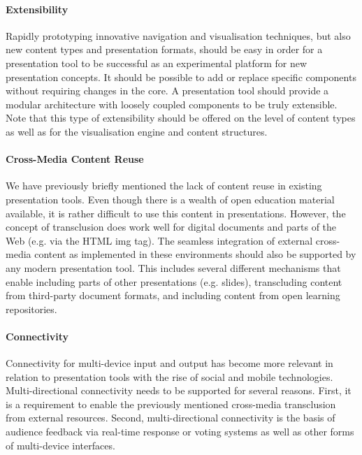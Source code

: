      \paragraph{Extensibility}
     
      Rapidly prototyping innovative navigation and visualisation techniques,
      but also new content types and presentation formats, should be easy in
      order for a presentation tool to be successful as an experimental
      platform for new presentation concepts. It should be possible to add or
      replace specific components without requiring changes in the core. A
      presentation tool should provide a modular architecture with loosely
      coupled components to be truly extensible. Note that this type of
      extensibility should be offered on the level of content types as well as
      for the visualisation engine and content structures.

     \paragraph{Cross-Media Content Reuse}
     
      We have previously briefly mentioned the lack of content reuse in
      existing presentation tools. Even though there is a wealth of open
      education material available, it is rather difficult to use this content
      in presentations. However, the concept of transclusion does work well for
      digital documents and parts of the Web (e.g. via the HTML img tag). The
      seamless integration of external cross-media content as implemented in
      these environments should also be supported by any modern presentation
      tool. This includes several different mechanisms that enable including
      parts of other presentations (e.g. slides), transcluding content from
      third-party document formats, and including content from open learning
      repositories.

     \paragraph{Connectivity}

      Connectivity for multi-device input and output has become more relevant
      in relation to presentation tools with the rise of social and mobile
      technologies. Multi-directional connectivity needs to be supported for
      several reasons. First, it is a requirement to enable the previously
      mentioned cross-media transclusion from external resources. Second,
      multi-directional connectivity is the basis of audience feedback via
      real-time response or voting systems \citep{dufresne-1} as well as other
      forms of multi-device interfaces.

